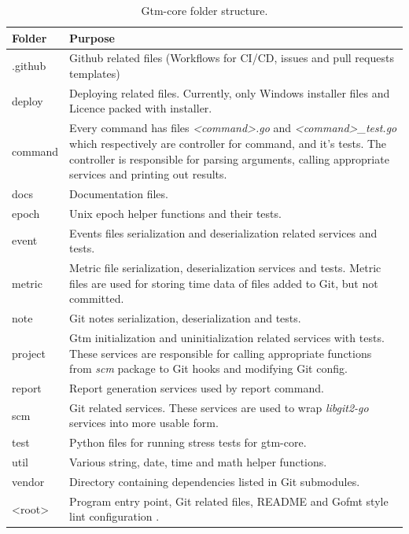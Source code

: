 \begin{table}[h]
    \centering
    \begin{tabular}{ | p{3cm} | p{10cm} |}
        \hline
        \textbf{Folder} & \textbf{Purpose}\\
        \hline
        .github & Github related files (Workflows for CI/CD, issues and pull requests templates)\\
        \hline
        deploy & Deploying related files.
        Currently, only Windows installer files and Licence packed with installer.\\
        \hline
        command & Every command has files \textit{<command>.go} and \textit{<command>\_test.go} which respectively are controller for command, and it's tests.
        The controller is responsible for parsing arguments, calling appropriate services and printing out results.\\
        \hline
        docs & Documentation files.\\
        \hline
        epoch & Unix epoch helper functions and their tests.\\
        \hline
        event & Events files serialization and deserialization related services and tests.\\
        \hline
        metric & Metric file serialization, deserialization services and tests.
        Metric files are used for storing time data of files added to Git, but not committed.\\
        \hline
        note & Git notes serialization, deserialization and tests.\\
        \hline
        project & Gtm initialization and uninitialization related services with tests.
        These services are responsible for calling appropriate functions from \textit{scm} package to Git hooks and modifying Git config.\\
        \hline
        report & Report generation services used by report command.\\
        \hline
        scm & Git related services.
        These services are used to wrap \textit{libgit2-go} services into more usable form.\\
        \hline
        test & Python files for running stress tests for gtm-core.\\
        \hline
        util & Various string, date, time and math helper functions.\\
        \hline
        vendor & Directory containing dependencies listed in Git submodules.\\
        \hline
        <root> & Program entry point, Git related files, README and Gofmt style lint configuration .\\
        \hline
    \end{tabular}
    \caption{Gtm-core folder structure.}
    \label{tab:gtm-core-folder-structure}
\end{table}

